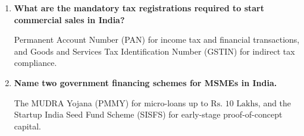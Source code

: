 \documentclass[12pt,a4paper]{article}
\newcommand{\Q}[1]{\textbf{#1}\par\noindent\ignorespaces}
\begin{document}
\begin{tcolorbox}[exambox, title={\textbf{Frequently Asked / Viva Questions}}]
\begin{enumerate}[topsep=0pt, label=\textbf{Q\arabic*.}, itemsep=5pt]
    It provides MSME classification, which unlocks interest rate concessions on bank loans, collateral-free credit guarantees, subsidies on patents, and eligibility for government procurement tenders.
  \item \Q{What are the mandatory tax registrations required to start commercial sales in India?}
    Permanent Account Number (PAN) for income tax and financial transactions, and Goods and Services Tax Identification Number (GSTIN) for indirect tax compliance.
  \item \Q{Name two government financing schemes for MSMEs in India.}
    The MUDRA Yojana (PMMY) for micro-loans up to $\text{Rs. } 10 \text{ Lakhs}$, and the Startup India Seed Fund Scheme (SISFS) for early-stage proof-of-concept capital.
  \end{enumerate}
\end{tcolorbox}
\end{document}
